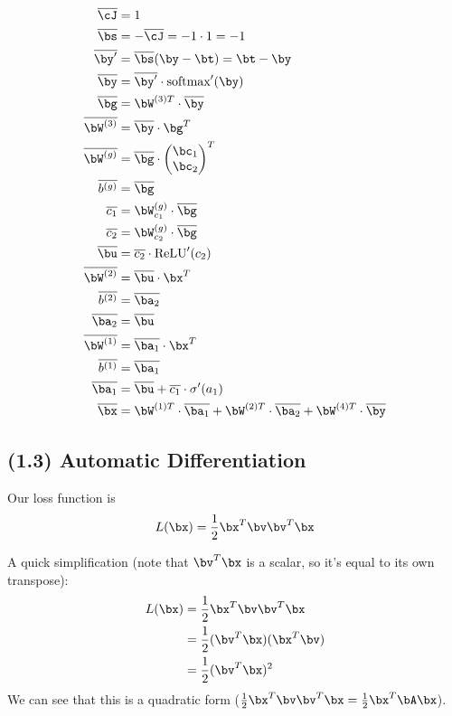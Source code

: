 \documentclass[12pt]{article}
\begin{document}
\begin{align*}
		\overline{\cJ} &= 1 \\
		\overline{\bs} &= -\overline{\cJ} = - 1 \cdot 1 = -1 \\
		\overline{\by'} &= \overline{\bs} (\by-\bt) = \bt-\by \\
		\overline{\by} &= \overline{\by'} \cdot \text{softmax}'(\by)  \\
		\overline{\bg} &= \bW^{(3)T}\cdot \overline{\by} \\
		\overline{\bW^{(3)}} &= \overline{\by}\cdot \bg^T \\
		\overline{\bW^{(g)}}&= \overline{\bg}\cdot
		\begin{pmatrix}
				\bc_1 \\
				\bc_2
		\end{pmatrix}^T \\
		\overline{b^{(g)}} &= \overline{\bg} \\
		\overline{c_1} &= \bW^{(g)}_{c_1} \cdot \overline{\bg}  \\
		\overline{c_2} &= \bW^{(g)}_{c_2} \cdot \overline{\bg}  \\
		\overline{\bu} &= \overline{c_2} \cdot \text{ReLU}'(c_2) \\
		\overline{\bW^{(2)}} &= \overline{\bu} \cdot \bx^T \\
		\overline{b^{(2)}} &= \overline{\ba_2} \\
		\overline{\ba_2} &= \overline{\bu} \\
		\overline{\bW^{(1)}} &= \overline{\ba_1} \cdot \bx^T \\
		\overline{b^{(1)}} &= \overline{\ba_1} \\
		\overline{\ba_1} &= \overline{\bu} + \overline{c_1} \cdot \sigma'(a_1) \\
		\overline{\bx} &= \bW^{(1)T} \cdot \overline{\ba_1} + \bW^{(2)T} \cdot \overline{\ba_2} + \bW^{(4)T} \cdot \overline{\by}
\end{align*}
\newpage
\subsection*{(1.3) Automatic Differentiation}

Our loss function is $$L(\bx) = \frac{1}{2}\bx^T\bv\bv^T\bx$$

A quick simplification (note that $\bv^T\bx$ is a scalar, so it's equal to its own transpose):
\begin{align*}
		L(\bx) &= \frac{1}{2}\bx^T\bv\bv^T\bx \\
		&= \frac{1}{2}(\bv^T\bx)(\bx^T\bv) \\
		&= \frac{1}{2}(\bv^T\bx)^2
\end{align*}
We can see that this is a quadratic form ($\frac{1}{2}\bx^T\bv\bv^T\bx = \frac{1}{2}\bx^T\bA\bx$).
\end{document}
